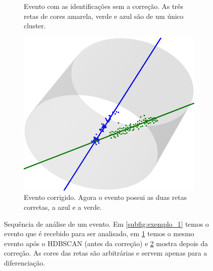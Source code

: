\documentclass[a4paper,12pt,oneside]{book}
\begin{document}
\begin{figure}[H]
\begin{subfigure}[t]{0.45\textwidth}
        \caption{Evento com as identificações sem a correção. As três retas de cores amarela, verde e azul são de um único cluster.}
        \label{subfig:antes_clustering}
    \end{subfigure}%
    \hspace{0.5cm}
    \begin{subfigure}[t]{0.45\textwidth}
        \centering
        \includegraphics[scale=0.25, width=.95\columnwidth]{figs/clustering_ex_3.png}
        \caption{Evento corrigido. Agora o evento possui as duas retas corretas, a azul e a verde.}
        \label{subfig:depois_clustering}
    \end{subfigure}
\caption{Sequência de análise de um evento. Em \ref{subfig:exemplo_1} temos o evento que é recebido para ser analisado, em \ref{subfig:antes_clustering} temos o mesmo evento após o \textsc{HDBSCAN} (antes da correção) e \ref{subfig:depois_clustering} mostra depois da correção. As cores das retas são arbitrárias e servem apenas para a diferenciação.}
\label{fig:3d_examples}
\end{figure}
\end{document}
